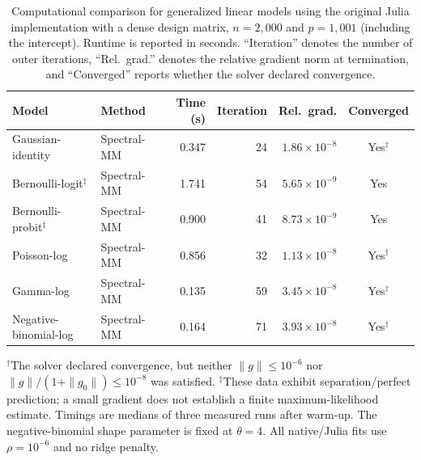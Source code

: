 
\begin{table}[htbp]
\centering
\small
\setlength{\tabcolsep}{4pt}
\caption{
Computational comparison for generalized linear models using the original Julia implementation with a dense design matrix,
$n=2{,}000$ and $p=1{,}001$ (including the intercept).
Runtime is reported in seconds. ``Iteration\textquotedblright{} denotes the number of outer iterations,
``Rel.\ grad.\textquotedblright{} denotes the relative gradient norm at termination, and
``Converged\textquotedblright{} reports whether the solver declared convergence.}
\label{tab:julia-glm-comparison-dense}
\begin{tabular}{llrrrc}
\toprule
Model & Method & Time (s) & Iteration & Rel.\ grad. & Converged \\
\midrule

Gaussian-identity
& Spectral-MM & 0.347 & 24 & $1.86\times10^{-8}$ & Yes$^{\dagger}$ \\
\midrule

Bernoulli-logit$^{\ddagger}$
& Spectral-MM & 1.741 & 54 & $5.65\times10^{-9}$ & Yes \\
\midrule

Bernoulli-probit$^{\ddagger}$
& Spectral-MM & 0.900 & 41 & $8.73\times10^{-9}$ & Yes \\
\midrule

Poisson-log
& Spectral-MM & 0.856 & 32 & $1.13\times10^{-8}$ & Yes$^{\dagger}$ \\
\midrule

Gamma-log
& Spectral-MM & 0.135 & 59 & $3.45\times10^{-8}$ & Yes$^{\dagger}$ \\
\midrule

Negative-binomial-log
& Spectral-MM & 0.164 & 71 & $3.93\times10^{-8}$ & Yes$^{\dagger}$ \\

\bottomrule
\end{tabular}
\par\smallskip
\begin{minipage}{\linewidth}
\footnotesize
$^{\dagger}$The solver declared convergence, but neither $\|g\|\leq 10^{-6}$ nor
$\|g\|/(1+\|g_0\|)\leq 10^{-8}$ was satisfied.
$^{\ddagger}$These data exhibit separation/perfect prediction; a small gradient does not establish a finite maximum-likelihood estimate.
Timings are medians of three measured runs after warm-up.
The negative-binomial shape parameter is fixed at $\theta=4$.
All native/Julia fits use $\rho=10^{-6}$ and no ridge penalty.
\end{minipage}
\end{table}

